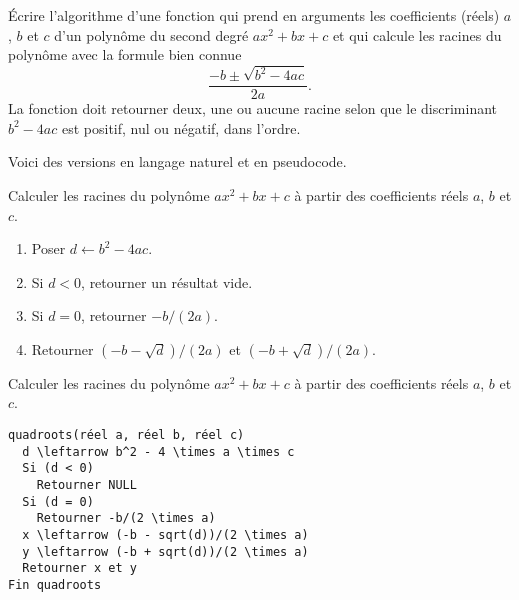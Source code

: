 \begin{exercice}
  Écrire l'algorithme d'une fonction  qui prend en
  arguments les coefficients (réels) $a$, $b$ et $c$ d'un polynôme du
  second degré $a x^2 + b x + c$ et qui calcule les racines du
  polynôme avec la formule bien connue
  \begin{equation*}
    \frac{-b \pm \sqrt{b^2 - 4ac}}{2a}.
  \end{equation*}
  La fonction doit retourner deux, une ou aucune racine selon que le
  discriminant $b^2 - 4ac$ est positif, nul ou négatif, dans l'ordre.
  \begin{sol}
    Voici des versions en langage naturel et en pseudocode.

    \begin{algorithme}
      Calculer les racines du polynôme $a x^2 + b x + c$ à partir des
      coefficients réels $a$, $b$ et $c$.
      \begin{enumerate}[1.]
      \item Poser $d \leftarrow b^2 - 4ac$.
      \item Si $d < 0$, retourner un résultat vide.
      \item Si $d = 0$, retourner $-b/(2a)$.
      \item Retourner $(-b - \sqrt{d})/(2a)$ et
        $(-b + \sqrt{d})/(2a)$.
      \end{enumerate}
    \end{algorithme}

    \begin{algorithme}
      Calculer les racines du polynôme $a x^2 + b x + c$ à partir des
      coefficients réels $a$, $b$ et $c$.
      \begin{Schunk}
\begin{Verbatim}[commandchars=\\\{\}]
quadroots(réel a, réel b, réel c)
  d \leftarrow b^2 - 4 \times a \times c
  Si (d < 0)
    Retourner NULL
  Si (d = 0)
    Retourner -b/(2 \times a)
  x \leftarrow (-b - sqrt(d))/(2 \times a)
  y \leftarrow (-b + sqrt(d))/(2 \times a)
  Retourner x et y
Fin quadroots
\end{Verbatim}
      \end{Schunk}
    \end{algorithme}
  \end{sol}
\end{exercice}

